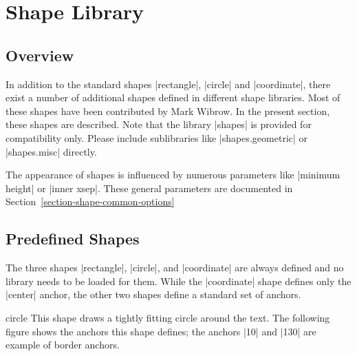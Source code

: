 %
%
%


\section{Shape Library}
\label{section-libs-shapes}


\subsection{Overview}

In addition to the standard shapes |rectangle|, |circle| and
|coordinate|, there exist a number of additional shapes defined in
different shape libraries. Most of these shapes have been
contributed by Mark Wibrow. In the present section, these shapes are
described. Note that the library |shapes| is provided for
compatibility only. Please include sublibraries like
|shapes.geometric| or |shapes.misc| directly.

The appearance of shapes is influenced by numerous parameters like
|minimum height| or |inner xsep|. These general parameters are documented in
Section~\ref{section-shape-common-options}


\subsection{Predefined Shapes}
\label{section-predefined-shapes}

The three shapes |rectangle|, |circle|, and |coordinate| are always
defined and no library needs to be loaded for them. While the
|coordinate| shape defines only the |center| anchor, the other two
shapes define a standard set of anchors.

\begin{shape}{circle}
  This shape draws a tightly fitting circle around the text. The
  following figure shows the anchors this shape defines; the anchors
  |10| and |130| are example of border anchors.
\begin{codeexample}[]
\Huge
{}
\end{codeexample}
\end{shape}

